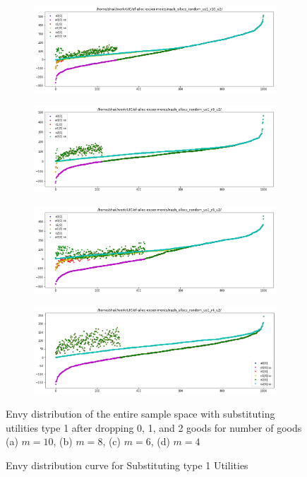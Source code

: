 \begin{figure}[h!]
  \centering
  \begin{subfigure}[b]{0.47\linewidth}
    \includegraphics[width=\linewidth]{images/subst1/pdf_subst1_10.png}
    \caption{}
  \end{subfigure}
  \begin{subfigure}[b]{0.47\linewidth}
    \includegraphics[width=\linewidth]{images/subst1/pdf_subst1_8.png}
    \caption{}
  \end{subfigure}
  \begin{subfigure}[b]{0.47\linewidth}
    \includegraphics[width=\linewidth]{images/subst1/pdf_subst1_6.png}
    \caption{}
  \end{subfigure}
  \begin{subfigure}[b]{0.47\linewidth}
    \includegraphics[width=\linewidth]{images/subst1/pdf_subst1_4.png}
    \caption{}
  \end{subfigure}
  \caption{Envy distribution curve for Substituting type 1 Utilities}
  \label{fig_efk_dist_curve_subst1}
  \small
    Envy distribution of the entire sample space with substituting utilities type 1 after dropping 0, 1, and 2 goods for number of goods (a) $m = 10$, (b) $m = 8$, (c) $m = 6$, (d) $m = 4$
\end{figure}

